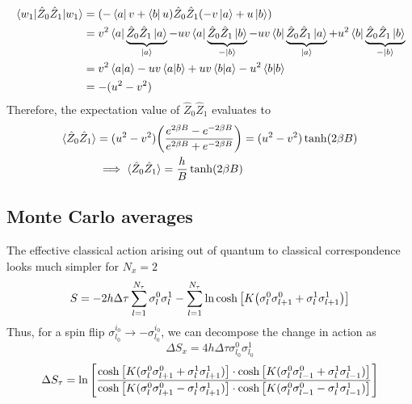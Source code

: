 \documentclass[../thesis_main.tex]{subfiles}
\begin{document}
\begin{align}
    \mel{w_1}{\hat{Z}_0 \hat{Z}_1}{w_1} & = (-\bra{a}v + \bra{b} u) \hat{Z}_0 \hat{Z}_1 (-v \ket{a} + u \ket{b}) \nonumber\\
    & = v^2 \bra{a}\underbrace{{\hat{Z}_0 \hat{Z}_1}\ket{a}}_{\ket{a}} -  uv \bra{a}\underbrace{{\hat{Z}_0 \hat{Z}_1}\ket{b}}_{-\ket{b}} - uv \bra{b}\underbrace{{\hat{Z}_0 \hat{Z}_1}\ket{a}}_{\ket{a}} + u^2 \bra{b}\underbrace{{\hat{Z}_0 \hat{Z}_1}\ket{b}}_{-\ket{b}} \nonumber\\ 
    & = v^2 \braket{a}{a} - uv \braket{a}{b} + uv \braket{b}{a} - u^2\braket{b}{b} \nonumber\\
    & = -(u^2 - v^2)
\end{align}
Therefore, the expectation value of $\hat{Z}_0 \hat{Z}_1$ evaluates to 
\begin{align}
    \langle \hat{Z}_0 \hat{Z}_1 \rangle & = (u^2-v^2) \qty(\frac{e^{2\beta B} - e^{-2\beta B}}{e^{2\beta B} + e^{-2\beta B}}) = (u^2-v^2) \tanh (2\beta B) \nonumber \\ 
    & \implies \langle{\hat{Z}_0 \hat{Z}_1}\rangle = \frac{h}{B} \tanh(2\beta B)
    \label{ZZ-hat_expval}
\end{align}

\subsection{Monte Carlo averages}
The effective classical action arising out of quantum to classical correspondence looks much simpler for $N_x=2$   
\begin{equation}
    S = - 2h \Delta \tau \sum_{l=1}^{N_\tau} \sigma^{0}_l \sigma^{1}_{l} - \sum_{l=1}^{N_\tau} \ln \cosh \qty[K \qty(\sigma^0_l \sigma^0_{l+1} + \sigma^1_l \sigma^1_{l+1})] 
\end{equation}
Thus, for a spin flip $\sigma^{i_0}_{l_0} \to - \sigma^{i_0}_{l_0}$, we can decompose the change in action as 
\[
    \Delta S_x = 4 h \Delta \tau \sigma^{0}_{l_0} \sigma^{1}_{l_0}  
\]
\[
    \Delta S_\tau = \ln \qty[ \frac{\cosh\qty[K(\sigma^{0}_{l} \sigma^{0}_{l+1} + \sigma^{1}_{l} \sigma^{1}_{l+1} )] \cdot \cosh\qty[K(\sigma^{0}_{l} \sigma^{0}_{l-1} + \sigma^{1}_{l} \sigma^{1}_{l-1} )] }{\cosh\qty[K(\sigma^{0}_{l} \sigma^{0}_{l+1} - \sigma^{1}_{l} \sigma^{1}_{l+1} )] \cdot \cosh\qty[K(\sigma^{0}_{l} \sigma^{0}_{l-1} - \sigma^{1}_{l} \sigma^{1}_{l-1} )]}  ]
\]
\end{document}
